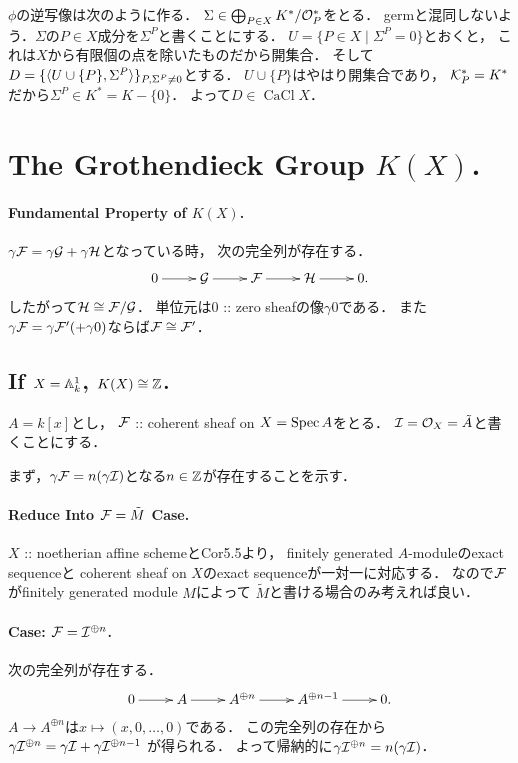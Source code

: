 \documentclass[a4paper]{jsarticle}
\newcommand{\CaCl}{\operatorname{CaCl}}
\begin{document}
    $\phi$の逆写像は次のように作る．
    $\Sigma \in \bigoplus_{P \in X}  K^*/\mathcal{O}_P^*$をとる．
    germと混同しないよう．$\Sigma$の$P \in X$成分を$\Sigma^P$と書くことにする．
    $U=\{P \in X \mid \Sigma^P=0\}$とおくと，
    これは$X$から有限個の点を除いたものだから開集合．
    そして$D=\{\langle U \cup \{P\},\Sigma^P \rangle\}_{P, \Sigma^P \neq 0}$とする．
    $U \cup \{P\}$はやはり開集合であり，
    $\mathcal{K}_P^*=K^*$だから$\Sigma^P \in K^*=K-\{0\}$．
    よって$D \in \CaCl X$．

\section{The Grothendieck Group $K(X)$.} %
    \paragraph{Fundamental Property of $K(X)$.}
    $\gamma \mathcal{F}=\gamma \mathcal{G}+\gamma \mathcal{H}$となっている時，
    次の完全列が存在する．
    \[
        \xymatrix
        {
            0 \ar[r]& \shG \ar[r]& \shF \ar[r]& \shH \ar[r]& 0.
        }
    \]
    したがって$\mathcal{H} \cong \mathcal{F}/\mathcal{G}$．
    単位元は$0$ :: zero sheafの像$\gamma 0$である．
    また$\gamma \mathcal{F}=\gamma \mathcal{F}'(+\gamma 0)$ならば$\mathcal{F} \cong \mathcal{F}'$．

    \subsection{If $X=\mathbb{A}^1_k$, $K(X) \cong \mathbb{Z}$.}
    $A=k[x]$とし，
    $\mathcal{F}$ :: coherent sheaf on $X=\operatorname{Spec} A$をとる．
    $\mathcal{I}=\mathcal{O}_X=\tilde{A}$と書くことにする．

    まず，$\gamma \mathcal{F}=n (\gamma \mathcal{I})$となる$n \in \mathbb{Z}$が存在することを示す．

    \paragraph{Reduce Into $\mathcal{F}=\tilde{M}$ Case.}
    $X$ :: noetherian affine schemeとCor5.5より，
    finitely generated $A$-moduleのexact sequenceと
    coherent sheaf on $X$のexact sequenceが一対一に対応する．
    なので$\mathcal{F}$がfinitely generated module $M$によって
    $\tilde{M}$と書ける場合のみ考えれば良い．

    \paragraph{Case: $\mathcal{F}=\mathcal{I}^{\oplus n}$.}
    次の完全列が存在する．
    \[
        \xymatrix
        {
            0 \ar[r]& A \ar[r]& A^{\oplus n} \ar[r]& A^{\oplus n-1} \ar[r]& 0.
        }
    \]
    $A \to A^{\oplus n}$は$x \mapsto (x,0,\dots,0)$である．
    この完全列の存在から
    $\gamma \mathcal{I}^{\oplus n}=\gamma \mathcal{I}+\gamma \mathcal{I}^{\oplus n-1}$
    が得られる．
    よって帰納的に$\gamma \mathcal{I}^{\oplus n}=n (\gamma \mathcal{I})$．
\end{document}
